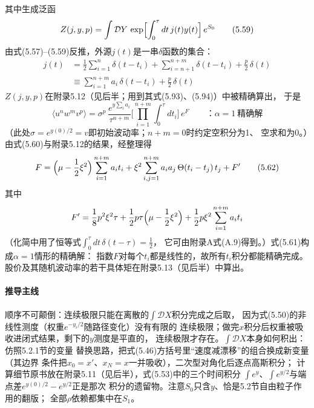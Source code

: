 其中生成泛函
\begin{equation*}
Z(j,y,p)=\int\mathcal{D}Y\,\exp\Bigl[\int_{0}^{\tau}dt\,j(t)y(t)\Bigr]\,e^{S_{0}}
\tag{5.59}
\end{equation*}
由式(5.57)--(5.59)反推，外源$j(t)$是一串$\delta$函数的集合：
\begin{align*}
j(t)&=\frac{1}{2}\sum_{i=1}^{n}\delta(t-t_{i})
+\sum_{i=n+1}^{n+m}\delta(t-t_{i})+\frac{p}{2}\,\delta(t)\\
&\equiv\sum_{i=1}^{n+m}a_{i}\,\delta(t-t_{i})+\frac{p}{2}\,\delta(t)
\tag{5.60}
\end{align*}
$Z(j,y,p)$在附录5.12（见后半；用到其式(5.93)、(5.94)）中被精确算出，
于是
\begin{equation*}
\langle u^{n}w^{m}v^{p}\rangle
=\sigma^{p}\,\frac{e^{y\sum_{i}a_{i}}}{\tau^{n+m}}
\Biggl[\prod_{i=1}^{n+m}\int_{0}^{\tau}dt_{i}\Biggr]\,e^{F}
\qquad\text{：}\alpha=1\ \text{精确解}
\tag{5.61}
\end{equation*}
（此处$\sigma=e^{y(0)/2}=v$即初始波动率；$n+m=0$时约定空积分为1、
空求和为0。）由式(5.60)与附录5.12的结果，经整理得
\begin{equation*}
F=\Bigl(\mu-\frac{1}{2}\xi^{2}\Bigr)\sum_{i=1}^{n+m}a_{i}t_{i}
+\xi^{2}\sum_{i,j=1}^{n+m}a_{i}a_{j}\,\Theta(t_{i}-t_{j})\,t_{j}+F'
\tag{5.62}
\end{equation*}
其中
\begin{equation*}
F'=\frac{1}{8}p^{2}\xi^{2}\tau
+\frac{1}{2}p\tau\Bigl(\mu-\frac{1}{2}\xi^{2}\Bigr)
+\frac{1}{2}p\xi^{2}\sum_{i=1}^{n+m}a_{i}t_{i}
\end{equation*}
（化简中用了恒等式$\int_{0}^{\tau}dt\,\delta(t-\tau)=\frac{1}{2}$，
它可由附录A式(A.9)得到。）式(5.61)构成$\alpha=1$情形的精确解：
指数$F$对每个$t_{i}$都是线性的，故所有$t_{i}$积分都能精确完成。
股价及其随机波动率的若干具体矩在附录5.13（见后半）中算出。

\paragraph{推导主线}
顺序不可颠倒：连续极限只能在离散的$\int\mathcal{D}X$积分完成之后取，
因为式(5.50)的非线性测度（权重$e^{-y_{i}/2}$随路径变化）没有有限的
连续极限；做完$x$积分后权重被吸收进闭式结果，剩下的$y$测度是平直的，
连续极限才存在。$\int\mathcal{D}X$本身如何积出：仿照5.2.1节的变量
替换思路，把式(5.46)方括号里“速度减漂移”的组合换成新变量（其边界
条件把$x_{0}=x'$、$x_{N}=x$一并吸收），二次型对角化后逐点高斯积分；
计算细节原书放在附录5.11（见后半），式(5.53)中的三个时间积分
$\int e^{y}$、$\int e^{y/2}$与端点差$e^{y(0)/2}-e^{y/2}$正是那次
积分的遗留物。注意$S_{0}$只含$y$、恰是5.2节自由粒子作用的翻版；
全部$\rho$依赖都集中在$S_{1}$。

